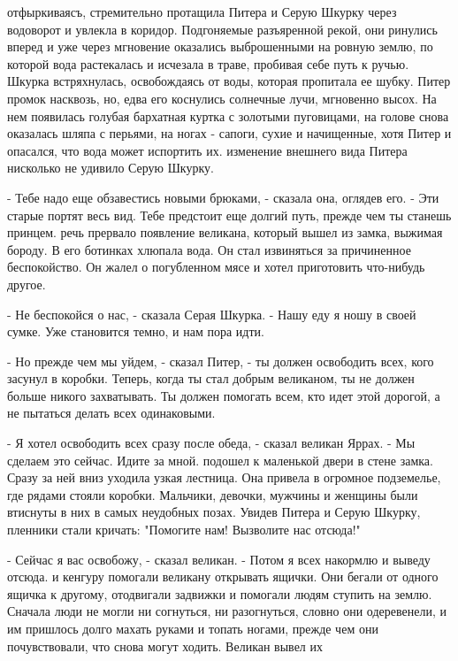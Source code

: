 отфыркиваясъ, стремительно протащила Питера и Серую Шкурку через 
водоворот и увлекла в коридор. Подгоняемые разъяренной рекой, они 
ринулись вперед и уже через мгновение оказались выброшенными на ровную 
землю, по которой вода растекалась и исчезала в траве, пробивая себе 
путь к ручью.
 Шкурка встряхнулась, освобождаясь от воды, которая пропитала 
ее шубку. Питер промок насквозь, но, едва его коснулись солнечные 
лучи, мгновенно высох. На нем появилась голубая бархатная куртка с 
золотыми пуговицами, на голове снова оказалась шляпа с перьями, на 
ногах - сапоги, сухие и начищенные, хотя Питер и опасался, что вода 
может испортить их.
 изменение внешнего вида Питера нисколько не удивило Серую 
Шкурку.
\par- Тебе надо еще обзавестись новыми брюками, - сказала она, оглядев 
его. - Эти старые портят весь вид. Тебе предстоит еще долгий путь, 
прежде чем ты станешь принцем.
 речь прервало появление великана, который вышел из замка, 
выжимая бороду. В его ботинках хлюпала вода. Он стал извиняться за 
причиненное беспокойство. Он жалел о погубленном мясе и хотел 
приготовить что-нибудь другое.
\par- Не беспокойся о нас, - сказала Серая Шкурка. - Нашу еду я ношу в 
своей сумке. Уже становится темно, и нам пора идти.
\par- Но прежде чем мы уйдем, - сказал Питер, - ты должен освободить 
всех, кого засунул в коробки. Теперь, когда ты стал добрым великаном, 
ты не должен больше никого захватывать. Ты должен помогать всем, кто 
идет этой дорогой, а не пытаться делать всех одинаковыми.
\par- Я хотел освободить всех сразу после обеда, - сказал великан 
Яррах. - Мы сделаем это сейчас. Идите за мной.
 подошел к маленькой двери в стене замка. Сразу за ней вниз 
уходила узкая лестница. Она привела в огромное подземелье, где рядами 
стояли коробки. Мальчики, девочки, мужчины и женщины были втиснуты в 
них в самых неудобных позах. Увидев Питера и Серую Шкурку, пленники 
стали кричать: "Помогите нам! Вызволите нас отсюда!"
\par- Сейчас я вас освобожу, - сказал великан. - Потом я всех накормлю 
и выведу отсюда.
 и кенгуру помогали великану открывать ящички. Они бегали от 
одного ящичка к другому, отодвигали задвижки и помогали людям ступить 
на землю. Сначала люди не могли ни согнуться, ни разогнуться, словно 
они одеревенели, и им пришлось долго махать руками и топать ногами, 
прежде чем они почувствовали, что снова могут ходить. Великан вывел их 
